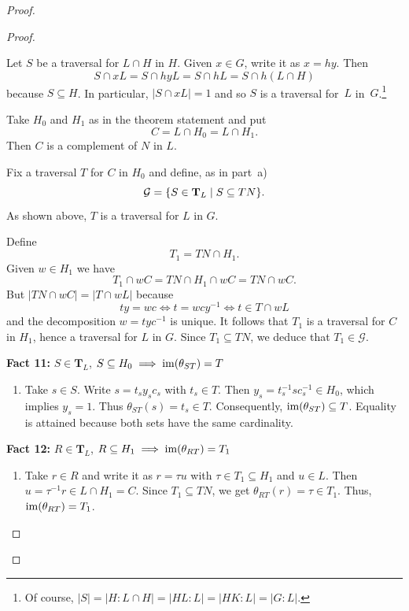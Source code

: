 \begin{proof}
\begin{proof}
\begin{enumerate}[a),font=\upshape]
    Let $S$ be a traversal for $L\cap H$ in $H$. Given $x\in G$, write it as $x=hy$. Then
    $$
        S\cap xL = S\cap hyL = S\cap hL = S\cap h(L\cap H)
    $$
    because $S\subseteq H$. In particular, $|S\cap xL|=1$ and so $S$ is a traversal for~$L$ in~$G$.\footnote{Of course, $|S|=|H:L\cap H|=|HL:L|=|HK:L|=|G:L|$.}
    
    Take $H_0$ and $H_1$ as in the theorem statement and put
    $$
        C=L\cap H_0=L\cap H_1.
    $$
    Then $C$ is a complement of $N$ in $L$.
    
    Fix a traversal $T$ for $C$ in $H_0$ and define, as in part~a)
    $$
        \mathcal G = \{S\in\mathbf T_L\mid S\subseteq TN\}.
    $$
    As shown above, $T$ is a traversal for $L$ in $G$.
    
    Define
    $$
        T_1 = TN\cap H_1.
    $$
    Given $w\in H_1$ we have
    $$
        T_1\cap wC = TN\cap H_1\cap wC = TN\cap wC.
    $$
    But $|TN\cap wC|=|T\cap wL|$ because
    $$
        ty=wc \iff t=wcy^{-1}\iff t\in T\cap wL
    $$
    and the decomposition $w=tyc^{-1}$ is unique. It follows that $T_1$ is a traversal for $C$ in $H_1$, hence a traversal for $L$ in $G$. Since $T_1\subseteq TN$, we deduce that $T_1\in\mathcal G$.

    \medskip

    \textbf{Fact 11:} $S\in\mathbf T_L$, $S\subseteq H_0\implies\operatorname{im}(\theta_{ST})=T$

    {\small
    \begin{enumerate}
        \item[$\to$] Take $s\in S$. Write $s=t_sy_sc_s$ with $t_s\in T$. Then $y_s=t_s^{-1}sc_s^{-1}\in H_0$, which implies $y_s=1$. Thus $\theta_{ST}(s) = t_s\in T$. Consequently, $\operatorname{im}(\theta_{ST})\subseteq T$. Equality is attained because both sets have the same cardinality.
    \end{enumerate}
    }

    \textbf{Fact 12:} $R\in\mathbf T_L$, $R\subseteq H_1\implies\operatorname{im}(\theta_{RT})=T_1$

    {\small
    \begin{enumerate}
        \item[$\to$] Take $r\in R$ and write it as $r=\tau u$ with $\tau\in T_1\subseteq H_1$ and $u\in L$. Then $u=\tau^{-1}r\in L\cap H_1=C$. Since $T_1\subseteq TN$, we get $\theta_{RT}(r)=\tau\in T_1$. Thus, $\operatorname{im}(\theta_{RT})=T_1$.
    \end{enumerate}
    }

    \medskip
    

\end{enumerate}
\end{proof}
\end{proof}
